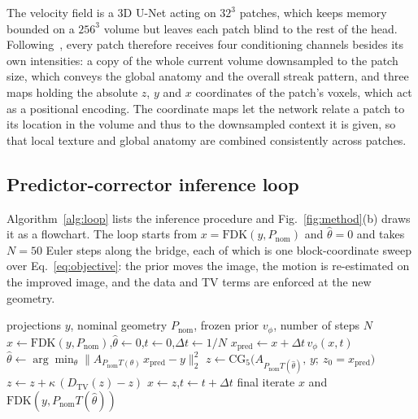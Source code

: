 \documentclass[11pt]{article}
\newcommand{\FDK}{\mathrm{FDK}}
\newcommand{\thetahat}{\hat\theta}
\newcommand{\Pnom}{P_{\mathrm{nom}}}
\begin{document}
The velocity field is a 3D U-Net acting on $32^3$ patches, which keeps memory bounded on a
$256^3$ volume but leaves each patch blind to the rest of the head. Following~\cite{yang25},
every patch therefore receives four conditioning channels besides its own intensities: a
copy of the whole current volume downsampled to the patch size, which conveys the global
anatomy and the overall streak pattern, and three maps holding the absolute $z$, $y$ and
$x$ coordinates of the patch's voxels, which act as a positional encoding. The coordinate
maps let the network relate a patch to its location in the volume and thus to the
downsampled context it is given, so that local texture and global anatomy are combined
consistently across patches.

\subsection{Predictor-corrector inference loop}
\label{sec:loop}

Algorithm~\ref{alg:loop} lists the inference procedure and Fig.~\ref{fig:method}(b)
draws it as a flowchart. The loop starts from
$x = \FDK(y,\Pnom)$ and $\thetahat = 0$ and takes $N{=}50$ Euler steps along the bridge,
each of which is one block-coordinate sweep over Eq.~\eqref{eq:objective}: the prior
moves the image, the motion is re-estimated on the improved image, and the data and TV
terms are enforced at the new geometry.

\begin{algorithm}[H]
\caption{Blind rigid-motion correction along the geometry bridge}
\label{alg:loop}
\begin{algorithmic}[1]
\Require projections $y$, nominal geometry $\Pnom$, frozen prior $v_\phi$, number of steps $N$
\State $x \gets \FDK(y,\Pnom)$,\quad $\thetahat \gets 0$,\quad $t \gets 0$,\quad $\Delta t \gets 1/N$
  \State $x_{\mathrm{pred}} \gets x + \Delta t\, v_\phi(x,t)$ 
  \State $\thetahat \gets \arg\min_\theta \|A_{\Pnom T(\theta)}\,x_{\mathrm{pred}} - y\|_2^2$ 
  \State $z \gets \mathrm{CG}_5\big(A_{\Pnom T(\thetahat)},\,y;\ z_0 = x_{\mathrm{pred}}\big)$ 
  \State $z \gets z + \kappa\,(D_{\mathrm{TV}}(z) - z)$ 
  \State $x \gets z$,\quad $t \gets t + \Delta t$
\EndFor
\State \Return final iterate $x$ and $\FDK(y,\Pnom T(\thetahat))$
\end{algorithmic}
\end{algorithm}
\end{document}
